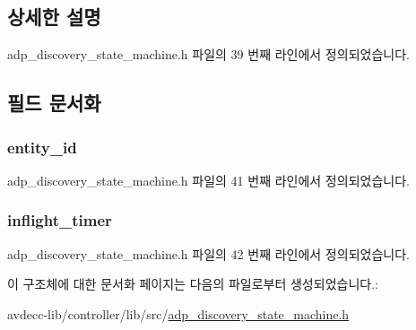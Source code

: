 \subsection{상세한 설명}


adp\+\_\+discovery\+\_\+state\+\_\+machine.\+h 파일의 39 번째 라인에서 정의되었습니다.



\subsection{필드 문서화}
\subsubsection[{\texorpdfstring{entity\+\_\+id}{entity_id}}]{ entity\+\_\+id}\hypertarget{structavdecc__lib_1_1adp__discovery__state__machine_1_1entities_af62ee4e75fffd2fbb80f324b5cbcddaa}{}\label{structavdecc__lib_1_1adp__discovery__state__machine_1_1entities_af62ee4e75fffd2fbb80f324b5cbcddaa}


adp\+\_\+discovery\+\_\+state\+\_\+machine.\+h 파일의 41 번째 라인에서 정의되었습니다.

\subsubsection[{\texorpdfstring{inflight\+\_\+timer}{inflight_timer}}]{ inflight\+\_\+timer}\hypertarget{structavdecc__lib_1_1adp__discovery__state__machine_1_1entities_a3ed459f3001adecc43378bfede8c3ddb}{}\label{structavdecc__lib_1_1adp__discovery__state__machine_1_1entities_a3ed459f3001adecc43378bfede8c3ddb}


adp\+\_\+discovery\+\_\+state\+\_\+machine.\+h 파일의 42 번째 라인에서 정의되었습니다.



이 구조체에 대한 문서화 페이지는 다음의 파일로부터 생성되었습니다.\+:\begin{DoxyCompactItemize}
\item 
avdecc-\/lib/controller/lib/src/\hyperlink{adp__discovery__state__machine_8h}{adp\+\_\+discovery\+\_\+state\+\_\+machine.\+h}\end{DoxyCompactItemize}
